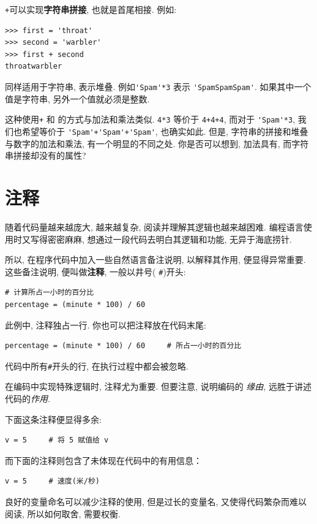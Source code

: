 \documentclass[10pt]{book}
\begin{document}
 {\tt +}可以实现{\bf 字符串拼接}, 也就是首尾相接. 例如:

\begin{verbatim}
>>> first = 'throat'
>>> second = 'warbler'
>>> first + second
throatwarbler
\end{verbatim}
%
 {\tt *} 同样适用于字符串, 表示堆叠. 例如\verb"'Spam'*3" 表示
\verb"'SpamSpamSpam'". 如果其中一个值是字符串, 另外一个值就必须是整数. 

这种使用{\tt +} 和 {\tt *}的方式与加法和乘法类似. 
 {\tt 4*3} 等价于 {\tt 4+4+4}, 
而对于 \verb"'Spam'*3",  
我们也希望等价于 \verb"'Spam'+'Spam'+'Spam'", 也确实如此. 
但是, 字符串的拼接和堆叠与数字的加法和乘法, 有一个明显的不同之处. 
你是否可以想到, 加法具有, 而字符串拼接却没有的属性?



\section{注释}

随着代码量越来越庞大, 越来越复杂, 
阅读并理解其逻辑也越来越困难. 
编程语言使用时又写得密密麻麻, 
想通过一段代码去明白其逻辑和功能, 无异于海底捞针. 

所以, 在程序代码中加入一些自然语言备注说明, 
以解释其作用, 便显得异常重要. 
这些备注说明, 便叫做{\bf 注释},  一般以井号( \verb"#")开头:

\begin{verbatim}
# 计算所占一小时的百分比
percentage = (minute * 100) / 60
\end{verbatim}
%
此例中, 注释独占一行. 你也可以把注释放在代码末尾:

\begin{verbatim}
percentage = (minute * 100) / 60     # 所占一小时的百分比
\end{verbatim}
%
代码中所有{\tt \#}开头的行, 在执行过程中都会被忽略. 

在编码中实现特殊逻辑时, 注释尤为重要. 
但要注意, 说明编码的 {\em 缘由},
远胜于讲述代码的{\em 作用}. 

下面这条注释便显得多余:

\begin{verbatim}
v = 5     # 将 5 赋值给 v
\end{verbatim}
%

而下面的注释则包含了未体现在代码中的有用信息：

\begin{verbatim}
v = 5     # 速度(米/秒) 
\end{verbatim}
%
良好的变量命名可以减少注释的使用, 
但是过长的变量名, 又使得代码繁杂而难以阅读, 
所以如何取舍, 需要权衡. 
\end{document}
